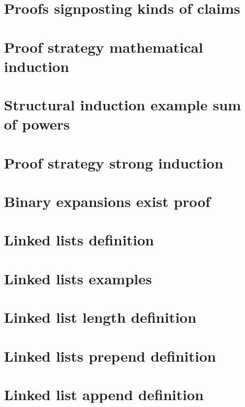 \section*{Proofs signposting kinds of claims}

\vfill
\section*{Proof strategy mathematical induction}

\vfill
\section*{Structural induction example sum of powers}

\vfill
\section*{Proof strategy strong induction}

\vfill
\section*{Binary expansions exist proof}

\vfill
\section*{Linked lists definition}

\vfill
\section*{Linked lists examples}

\vfill
\section*{Linked list length definition}

\vfill
\section*{Linked lists prepend definition}

\vfill
\section*{Linked list append definition}

\vfill
